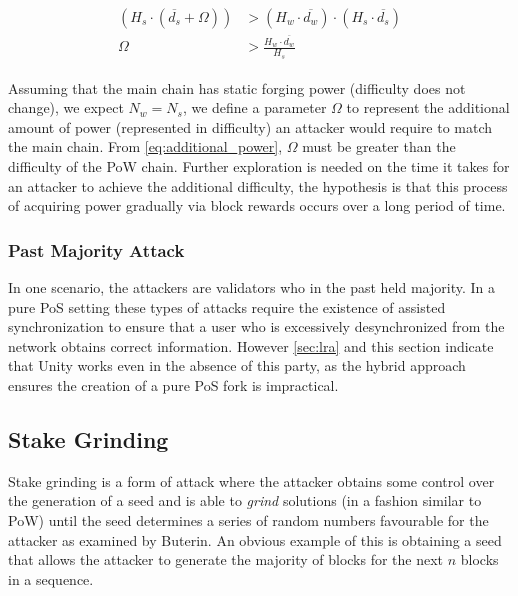 \documentclass[a4paper]{article}
\begin{document}
\begin{equation}
\label{eq:additional_power}
\begin{split}
\begin{aligned}
(H_s \cdot (\overline{d_{s}} + \Omega)) &> (H_w \cdot \overline{d_{w}}) \cdot (H_s \cdot \overline{d_{s}}) \\
\Omega &> \frac{H_w \cdot \overline{d_{w}}}{H_s}
\end{aligned}
\end{split}
\end{equation}

Assuming that the main chain has static forging power (difficulty does not change), we expect $N_w = N_s$, we define a parameter $\Omega$ to represent the additional amount of power (represented in difficulty) an attacker would require to match the main chain. From \cref{eq:additional_power}, $\Omega$ must be greater than the difficulty of the PoW chain. Further exploration is needed on the time it takes for an attacker to achieve the additional difficulty, the hypothesis is that this process of acquiring power gradually via block rewards occurs over a long period of time.

\subsubsection{Past Majority Attack}

In one scenario, the attackers are validators who in the past held majority. In a pure PoS setting these types of attacks require the existence of assisted synchronization to ensure that a user who is excessively desynchronized from the network obtains correct information. However \cref{sec:lra} and this section indicate that Unity works even in the absence of this party, as the hybrid approach ensures the creation of a pure PoS fork is impractical.

\subsection{Stake Grinding}
\label{sec:stake_grinding}

Stake grinding is a form of attack where the attacker obtains some control over the generation of a seed and is able to \textit{grind} solutions (in a fashion similar to PoW) until the seed determines a series of random numbers favourable for the attacker as examined by Buterin\cite{buterin_randomness}. An obvious example of this is obtaining a seed that allows the attacker to generate the majority of blocks for the next $n$ blocks in a sequence.
\end{document}

